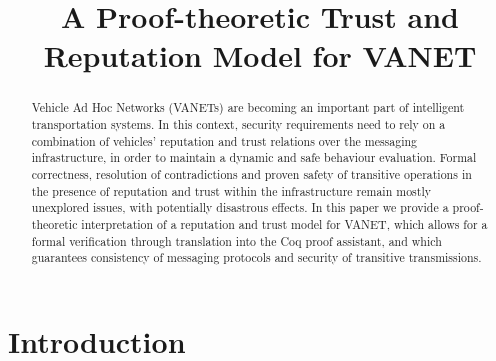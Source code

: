 \documentclass[compsoc, conference, letterpaper, 10pt, times]{IEEEtran}
\begin{document}
\title{A Proof-theoretic Trust and Reputation Model for VANET}


\author{
	}


\maketitle

\begin{abstract}
Vehicle Ad Hoc Networks (VANETs) are becoming an important part of intelligent transportation systems. In this context, security requirements need to rely on a combination of vehicles' reputation and trust relations over the messaging infrastructure, in order to maintain a dynamic and safe behaviour evaluation. Formal correctness, resolution of contradictions and proven safety of transitive operations in the presence of reputation and trust within the infrastructure remain mostly unexplored issues, with potentially disastrous effects. In this paper we provide a proof-theoretic  interpretation of a reputation and trust model for VANET, which allows for a formal verification through translation into the Coq proof assistant, and which guarantees consistency of messaging protocols and security of transitive transmissions.
\end{abstract}


\section{Introduction}\label{sec:intro}
\end{document}
